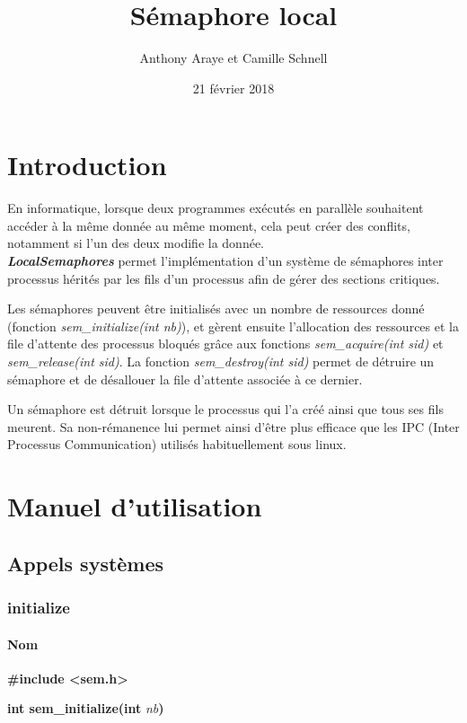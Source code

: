 \documentclass[12pt]{article}
\title{Sémaphore local}
\author{Anthony Araye et Camille Schnell}
\date{21 février 2018}
\begin{document}
\maketitle
\renewcommand{\contentsname}{Sommaire}
\tableofcontents
\newpage
\section{Introduction}
    En informatique, lorsque deux programmes exécutés en parallèle souhaitent accéder à la même donnée au même moment, cela peut créer des conflits, notamment si l'un des deux modifie la donnée. \\

    \textit{\textbf{LocalSemaphores}} permet l'implémentation d'un système de sémaphores inter processus hérités par les fils d'un processus afin de gérer des sections critiques.

    Les sémaphores peuvent être initialisés avec un nombre de ressources donné (fonction \textit{sem\_initialize(int nb)}), et gèrent ensuite l'allocation des ressources et la file d'attente des processus bloqués grâce aux fonctions \textit{sem\_acquire(int sid)} et \textit{sem\_release(int sid)}. La fonction \textit{sem\_destroy(int sid)} permet de détruire un sémaphore et de désallouer la file d'attente associée à ce dernier.

    Un sémaphore est détruit lorsque le processus qui l'a créé ainsi que tous ses fils meurent. Sa non-rémanence lui permet ainsi d'être plus efficace que les IPC (Inter Processus Communication) utilisés habituellement sous linux.

\newpage
\section{Manuel d'utilisation}
    \subsection{Appels systèmes}
      \subsubsection{initialize}
          \paragraph{Nom\\}
          \textbf{\#include <sem.h>}

          \textbf{int sem\_initialize(int }\textit{nb}\textbf{)}
\end{document}
